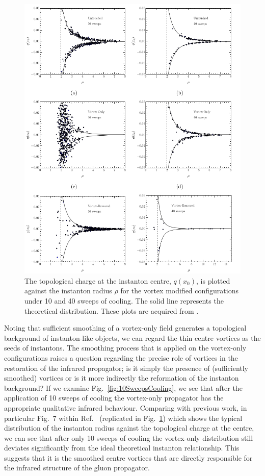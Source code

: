 %
\begin{figure}
\centering
\includegraphics[width=\linewidth]{./Instanton_Radius.png}
\caption{\label{fig:InstantonRadius} The topological charge at the instanton centre, $q(x_0)$, is plotted against the instanton radius $\rho$ for the vortex modified configurations under 10 and 40 sweeps of cooling. The solid line represents the theoretical distribution. These plots are acquired from \citet{Trewartha:2015ida}.}
\end{figure}
%
Noting that sufficient smoothing of a vortex-only field generates a topological background of instanton-like objects, we can regard the thin centre vortices as the seeds of instantons. The smoothing process that is applied on the vortex-only configurations raises a question regarding the precise role of vortices in the restoration of the infrared propagator; is it simply the presence of (sufficiently smoothed) vortices or is it more indirectly the reformation of the instanton background? If we examine Fig.~\ref{fig:10SweepsCooling}, we see that after the application of 10 sweeps of cooling the vortex-only propagator has the appropriate qualitative infrared behaviour. Comparing with previous work, in particular Fig.~7 within Ref.~\cite{Trewartha:2015ida} (replicated in Fig.~\ref{fig:InstantonRadius}) which shows the typical distribution of the instanton radius against the topological charge at the centre, we can see that after only 10 sweeps of cooling the vortex-only distribution still deviates significantly from the ideal theoretical instanton relationship. This suggests that it is the smoothed centre vortices that are directly responsible for the infrared structure of the gluon propagator.
